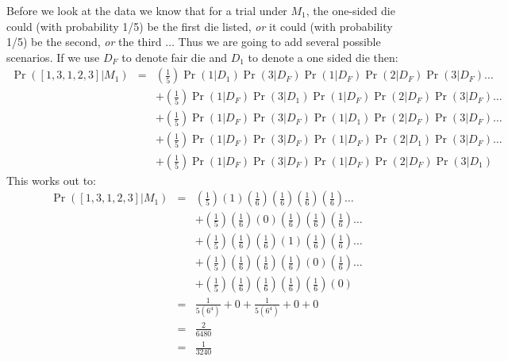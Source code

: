 \documentclass[11pt]{article}
\begin{document}
Before we look at the data we know that for  a trial under $M_1$, the one-sided die could (with probability 1/5) be the first die listed, {\em or} it could (with probability 1/5)  be the second, {\em or} the third $\ldots$
Thus we are going to add several possible scenarios.
If we use $D_F$ to denote fair die and $D_1$ to denote a one sided die then:
\begin{eqnarray}
	\Pr([1, 3, 1, 2, 3]|M_1) & = &  \left(\frac{1}{5}\right)\Pr(1|D_1)\Pr(3|D_F)\Pr(1|D_F)\Pr(2|D_F)\Pr(3|D_F) \ldots \\
		&  & + \left(\frac{1}{5}\right)\Pr(1|D_F)\Pr(3|D_1)\Pr(1|D_F)\Pr(2|D_F)\Pr(3|D_F) \ldots \\
		&  & + \left(\frac{1}{5}\right)\Pr(1|D_F)\Pr(3|D_F)\Pr(1|D_1)\Pr(2|D_F)\Pr(3|D_F) \ldots \\
		&  & + \left(\frac{1}{5}\right)\Pr(1|D_F)\Pr(3|D_F)\Pr(1|D_F)\Pr(2|D_1)\Pr(3|D_F) \ldots \\
		&  & + \left(\frac{1}{5}\right)\Pr(1|D_F)\Pr(3|D_F)\Pr(1|D_F)\Pr(2|D_F)\Pr(3|D_1)  
\end{eqnarray}
This works out to:
\begin{eqnarray}
	\Pr([1, 3, 1, 2, 3]|M_1) & = & \left(\frac{1}{5}\right)\left(1\right)\left(\frac{1}{6}\right)\left(\frac{1}{6}\right)\left(\frac{1}{6}\right)\left(\frac{1}{6}\right) \ldots \\
		&  & + \left(\frac{1}{5}\right)\left(\frac{1}{6}\right)\left(0\right)\left(\frac{1}{6}\right)\left(\frac{1}{6}\right)\left(\frac{1}{6}\right) \ldots \\
		&  & + \left(\frac{1}{5}\right)\left(\frac{1}{6}\right)\left(\frac{1}{6}\right)\left(1\right)\left(\frac{1}{6}\right)\left(\frac{1}{6}\right) \ldots \\
		&  & + \left(\frac{1}{5}\right)\left(\frac{1}{6}\right)\left(\frac{1}{6}\right)\left(\frac{1}{6}\right)\left(0\right)\left(\frac{1}{6}\right) \ldots \\
		&  & + \left(\frac{1}{5}\right)\left(\frac{1}{6}\right)\left(\frac{1}{6}\right)\left(\frac{1}{6}\right)\left(\frac{1}{6}\right)\left(0\right) \\
		& = & \frac{1}{5 (6^4)} + 0 + \frac{1}{5(6^4)} + 0 + 0\\
		& = & \frac{2}{6480} \\
		& = & \frac{1}{3240} 
\end{eqnarray}
\end{document}
